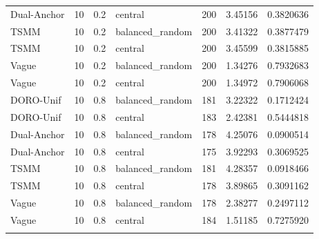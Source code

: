 \begin{longtable}{lllllll}
Dual-Anchor & 10 & 0.2 & central & 200 & 3.45156 & 0.3820636 \\ \addlinespace[3pt]
TSMM & 10 & 0.2 & balanced\_random & 200 & 3.41322 & 0.3877479 \\ \addlinespace[3pt]
TSMM & 10 & 0.2 & central & 200 & 3.45599 & 0.3815885 \\ \addlinespace[3pt]
Vague & 10 & 0.2 & balanced\_random & 200 & 1.34276 & 0.7932683 \\ \addlinespace[3pt]
Vague & 10 & 0.2 & central & 200 & 1.34972 & 0.7906068 \\ \addlinespace[3pt]
DORO-Unif & 10 & 0.8 & balanced\_random & 181 & 3.22322 & 0.1712424 \\ \addlinespace[3pt]
DORO-Unif & 10 & 0.8 & central & 183 & 2.42381 & 0.5444818 \\ \addlinespace[3pt]
Dual-Anchor & 10 & 0.8 & balanced\_random & 178 & 4.25076 & 0.0900514 \\ \addlinespace[3pt]
Dual-Anchor & 10 & 0.8 & central & 175 & 3.92293 & 0.3069525 \\ \addlinespace[3pt]
TSMM & 10 & 0.8 & balanced\_random & 181 & 4.28357 & 0.0918466 \\ \addlinespace[3pt]
TSMM & 10 & 0.8 & central & 178 & 3.89865 & 0.3091162 \\ \addlinespace[3pt]
Vague & 10 & 0.8 & balanced\_random & 178 & 2.38277 & 0.2497112 \\ \addlinespace[3pt]
Vague & 10 & 0.8 & central & 184 & 1.51185 & 0.7275920 \\ \addlinespace[3pt]
\bottomrule\end{longtable}

